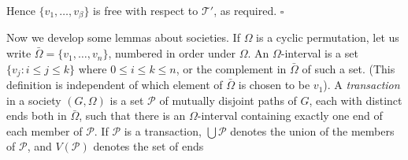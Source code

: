 Hence $\{v_1, \dots, v_\beta\}$ is free with respect to $\mathscr{T}'$, as required. $\square$


Now we develop some lemmas about societies. If $\Omega$ is a cyclic permutation, let us write $\bar{\Omega} = \{v_1, \dots, v_n\}$, numbered in order under $\Omega$. An $\Omega$-interval is a set $\{v_j : i \le j \le k\}$ where $0 \le i \le k \le n$, or the complement in $\bar{\Omega}$ of such a set. (This definition is independent of which element of $\bar{\Omega}$ is chosen to be $v_1$). A \textit{transaction} in a society $(G, \Omega)$ is a set $\mathscr{P}$ of mutually disjoint paths of $G$, each with distinct ends both in $\bar{\Omega}$, such that there is an $\Omega$-interval containing exactly one end of each member of $\mathscr{P}$. If $\mathscr{P}$ is a transaction, $\bigcup \mathscr{P}$ denotes the union of the members of $\mathscr{P}$, and $V(\mathscr{P})$ denotes the set of ends
